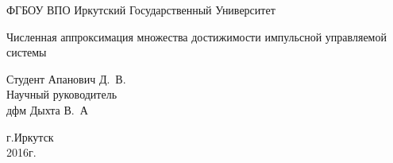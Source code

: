 \begin{titlepage}
  \newpage

  \begin{center}
    ФГБОУ ВПО Иркутский Государственный Университет
  \end{center}


  \vspace{8em}
  
  \begin{center}
    \Large Численная аппроксимация множества достижимости импульсной
    управляемой системы 
  \end{center}
  
  \vspace{2.5em}

  \begin{flushright}
    Студент  Апанович Д.~В.\\
    \vspace{1.5em}
    Научный руководитель \\
    дфм Дыхта В.~А
  \end{flushright}
  
  \vspace{\fill}
  
  \begin{center}
    г.Иркутск\\
    2016г.
  \end{center}
  

\end{titlepage}
